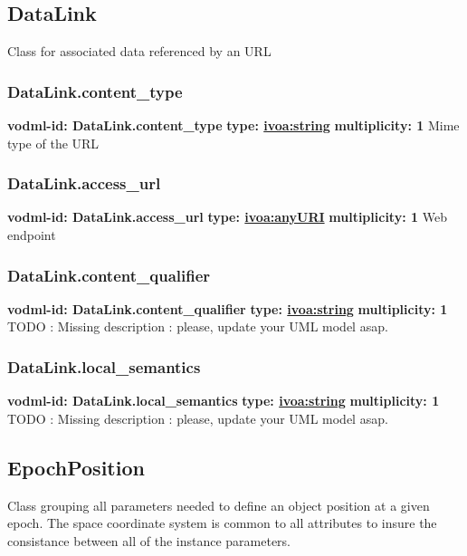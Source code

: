   \subsection{DataLink}
  \label{sect:DataLink}
    Class for associated data referenced by an URL

    \subsubsection{DataLink.content_type}
      \textbf{vodml-id: DataLink.content_type} \newline
      \textbf{type: \hyperref[sect:ivoa]{ivoa:string}} \newline
      \textbf{multiplicity: 1} \newline
      Mime type of the URL

    \subsubsection{DataLink.access_url}
      \textbf{vodml-id: DataLink.access_url} \newline
      \textbf{type: \hyperref[sect:ivoa]{ivoa:anyURI}} \newline
      \textbf{multiplicity: 1} \newline
      Web endpoint

    \subsubsection{DataLink.content_qualifier}
      \textbf{vodml-id: DataLink.content_qualifier} \newline
      \textbf{type: \hyperref[sect:ivoa]{ivoa:string}} \newline
      \textbf{multiplicity: 1} \newline
      TODO : Missing description : please, update your UML model asap.

    \subsubsection{DataLink.local_semantics}
      \textbf{vodml-id: DataLink.local_semantics} \newline
      \textbf{type: \hyperref[sect:ivoa]{ivoa:string}} \newline
      \textbf{multiplicity: 1} \newline
      TODO : Missing description : please, update your UML model asap.

  \subsection{EpochPosition}
  \label{sect:EpochPosition}
    Class grouping all parameters needed to define an object position at a given epoch. The space coordinate system is common to all attributes to insure the consistance between all of the instance parameters.

